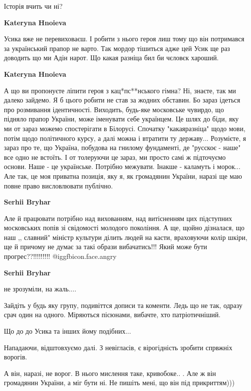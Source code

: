 \begin{itemize}
Історія вчить чи ні?

\begin{itemize} %
\textbf{Kateryna Hnoieva}

Усика вже не перевиховаєш. І робити з нього героя лиш тому що він потримався за
український прапор не варто. Так мордор тішиться адже цей Усик ще раз доводить
що ми Адін нарот. Що какая разніца бил би чєловєк хароший.


\textbf{Kateryna Hnoieva} 

А що ви пропонуєте ліпити героя з кац*пс**нського гімна? Ні, знаєте, так ми
далеко зайдемо. Я б цього робити не став за жодних обставин. Бо зараз ідеться
про розмивання ідентичності. Виходить, будь-яке московське чувирдо, що підняло
прапор України, може іменувати себе українцем. Це шлях до біди, яку ми от зараз
можемо спостерігати в Білорусі. Спочатку "какаяразніца" щодо мови, потім щодо
політичного курсу, а далі можна і втратити ту державу... Розумієте, я зараз про
те, що Україна, побудова на гнилому фундаменті, де "русскоє - наше" все одно не
встоїть. І от толеруючи це зараз, ми просто самі ж підточуємо основи. Наше - це
українське. Потрібно межувати. Інакше - каламуть і морок... Але так, це моя
приватна позиція, яку я, як громадянин України, наразі ще маю повне право
висловлювати публічно.

\textbf{Serhii Bryhar}

Але й працювати потрібно над вихованням, над витісненням цих підступних
московських попів зі свідомості молодого покоління. А ще, щойно дізналася, що наш
,, славний" міністр культури ділить людей на касти, враховуючи колір шкіри, ще й
причому не думає за такі образи вибачатись!!! Який може бути
прогрес??!!!!!!!!! @igg{fbicon.face.angry} 


\textbf{Serhii Bryhar} 

не зрозуміли, на жаль....

Зайдіть у будь яку групу, подивіттся дописи та коменти. Ледь що не так, одразу
срач один на одного. Міряються пісюнами, вибачте, хто патріотичніший.

Що до до Усика та інших йому подібних...

Нападаючи, відштовхуємо далі. З невігласів, є вірогідність зробити спрвжніх
ворогів.

А він, наразі, не ворог. В нього мислення таке, кривобоке.. . Але ж він
громадянин України, а міг бути ні. Не пишіть мені, що він під прикриттям)))


\end{itemize}
\end{itemize}
